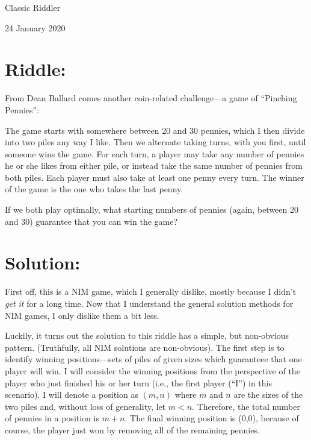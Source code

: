 \documentclass{article}
\begin{document}
\pagestyle{empty} %

\begin{center}
{\LARGE Classic Riddler}

\vspace{0.15in}

{\Large 24 January 2020}
\end{center}


\section*{Riddle:}

From Dean Ballard comes another coin-related challenge---a game of ``Pinching Pennies'':

The game starts with somewhere between 20 and 30 pennies, which I then divide into two piles any way I like.
Then we alternate taking turns, with you first, until someone wins the game.
For each turn, a player may take any number of pennies he or she likes from either pile, or instead take the same number of pennies from both piles.
Each player must also take at least one penny every turn.
The winner of the game is the one who takes the last penny.

If we both play optimally, what starting numbers of pennies (again, between 20 and 30) guarantee that you can win the game?


\section*{Solution:}

First off, this is a NIM game, which I generally dislike, mostly because I didn't \textit{get it} for a long time.
Now that I understand the general solution methods for NIM games, I only dislike them a bit less.

Luckily, it turns out the solution to this riddle has a simple, but non-obvious pattern.
(Truthfully, all NIM solutions are non-obvious).
The first step is to identify winning positions---sets of piles of given sizes which guaranteee that one player will win.
I will consider the winning positions from the perspective of the player who just finished his or her turn (i.e., the first player (``I'') in this scenario).
I will denote a position as $(m,n)$ where $m$ and $n$ are the sizes of the two piles and, without loss of generality, let $m<n$.
Therefore, the total number of pennies in a position is $m+n$.
The final winning position is (0,0), because of course, the player just won by removing all of the remaining pennies.
\end{document}
